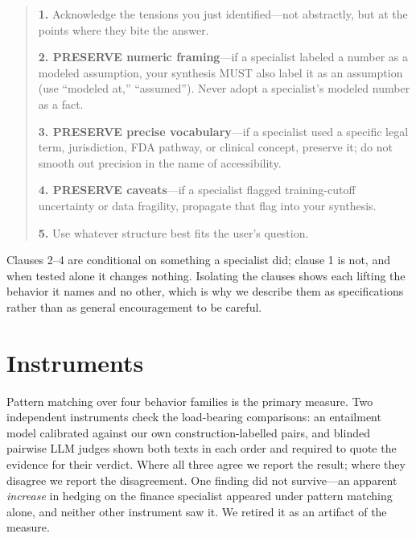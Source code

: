 \documentclass[11pt]{article}
\begin{document}
\begin{quote}\small
\textbf{1.} Acknowledge the tensions you just identified---not abstractly, but
at the points where they bite the answer.

\textbf{2. PRESERVE numeric framing}---if a specialist labeled a number as a
modeled assumption, your synthesis MUST also label it as an assumption (use
``modeled at,'' ``assumed''). Never adopt a specialist's modeled number as a
fact.

\textbf{3. PRESERVE precise vocabulary}---if a specialist used a specific legal
term, jurisdiction, FDA pathway, or clinical concept, preserve it; do not
smooth out precision in the name of accessibility.

\textbf{4. PRESERVE caveats}---if a specialist flagged training-cutoff
uncertainty or data fragility, propagate that flag into your synthesis.

\textbf{5.} Use whatever structure best fits the user's question.
\end{quote}

Clauses 2--4 are conditional on something a specialist did; clause 1 is not,
and when tested alone it changes nothing. Isolating the clauses shows each
lifting the behavior it names and no other, which is why we describe them as
specifications rather than as general encouragement to be careful.

\section{Instruments}
\label{app:instr}
Pattern matching over four behavior families is the primary measure. Two
independent instruments check the load-bearing comparisons: an entailment
model calibrated against our own construction-labelled pairs, and blinded
pairwise LLM judges shown both texts in each order and required to quote the
evidence for their verdict. Where all three agree we report the result; where
they disagree we report the disagreement. One finding did not survive---an
apparent \emph{increase} in hedging on the finance specialist appeared under
pattern matching alone, and neither other instrument saw it. We retired it as
an artifact of the measure.
\end{document}
